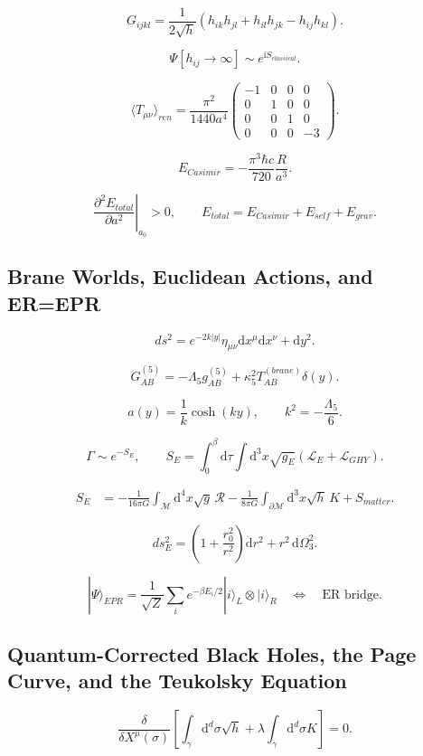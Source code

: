 \documentclass[11pt,a4paper]{article}
\newcommand{\R}{\mathcal{R}}
\newcommand{\M}{\mathcal{M}}
\newcommand{\Lag}{\mathcal{L}}
\newcommand{\dd}{\mathrm{d}}
\newcommand{\ii}{\mathrm{i}}
\begin{document}
\[
G_{ijkl}=\frac{1}{2\sqrt{h}}
\left(h_{ik}h_{jl}+h_{il}h_{jk}-h_{ij}h_{kl}\right).
\]

\[
\Psi[h_{ij}\to\infty]\sim e^{\ii S_{classical}}.
\]

\[
\langle T_{\mu\nu}\rangle_{ren}
=\frac{\pi^2}{1440a^4}
\begin{pmatrix}
-1&0&0&0\\
0&1&0&0\\
0&0&1&0\\
0&0&0&-3
\end{pmatrix}.
\]

\[
E_{Casimir}=-\frac{\pi^3\hbar c}{720}\frac{R}{a^3}.
\]

\[
\left.\frac{\partial^2E_{total}}{\partial a^2}\right|_{a_0}>0,
\qquad
E_{total}=E_{Casimir}+E_{self}+E_{grav}.
\]

\subsection{Brane Worlds, Euclidean Actions, and ER=EPR}

\[
ds^2=e^{-2k|y|}\eta_{\mu\nu}\dd x^\mu\dd x^\nu+\dd y^2.
\]

\[
G_{AB}^{(5)}=-\Lambda_5g_{AB}^{(5)}
+\kappa_5^2T_{AB}^{(brane)}\delta(y).
\]

\[
a(y)=\frac1k\cosh(ky),\qquad
k^2=-\frac{\Lambda_5}{6}.
\]

\[
\Gamma\sim e^{-S_E},\qquad
S_E=\int_0^\beta\dd\tau\int\dd^3x\sqrt{g_E}
\left(\Lag_E+\Lag_{GHY}\right).
\]

\begin{align*}
S_E
&=-\frac{1}{16\pi G}\int_{\M}\dd^4x\sqrt{g}\,\R
-\frac{1}{8\pi G}\int_{\partial\M}\dd^3x\sqrt{h}\,K
+S_{matter}.
\end{align*}

\[
ds_E^2=\left(1+\frac{r_0^2}{r^2}\right)\dd r^2
+r^2\,\dd\Omega_3^2.
\]

\[
|\Psi\rangle_{EPR}
=\frac{1}{\sqrt{Z}}\sum_i e^{-\beta E_i/2}|i\rangle_L\otimes|i\rangle_R
\quad\Longleftrightarrow\quad \text{ER bridge}.
\]

\subsection{Quantum-Corrected Black Holes, the Page Curve, and the Teukolsky Equation}

\[
\frac{\delta}{\delta X^\mu(\sigma)}
\left[\int_\gamma\dd^d\sigma\sqrt{h}
+\lambda\int_\gamma\dd^d\sigma K\right]=0.
\]
\end{document}
